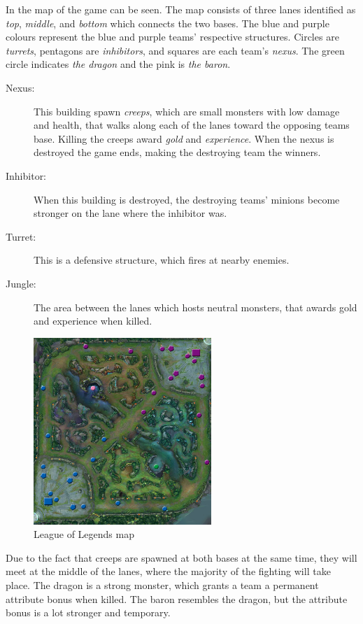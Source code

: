 In  the map of the game can be seen. The map consists of three lanes identified as \emph{top}, \emph{middle}, and \emph{bottom} which connects the two bases. The blue and purple colours represent the blue and purple teams' respective structures. Circles are \emph{turrets}, pentagons are \emph{inhibitors}, and squares are each team's \emph{nexus}. The green circle indicates \emph{the dragon} and the pink is \emph{the baron}.

\begin{description}
\item[Nexus:] This building spawn \emph{creeps}, which are small monsters with low damage and health, that walks along each of the lanes toward the opposing teams base. Killing the creeps award \emph{gold} and \emph{experience}. When the nexus is destroyed the game ends, making the destroying team the winners.
\item[Inhibitor:] When this building is destroyed, the destroying teams' minions become stronger on the lane where the inhibitor was.
\item[Turret:] This is a defensive structure, which fires at nearby enemies.
\item[Jungle:] The area between the lanes which hosts neutral monsters, that awards gold and experience when killed.
\end{description}

\begin{figure}[!htb]
  \centering
    \includegraphics[width=0.6\textwidth]{img/lolmap.jpg}
  \caption{League of Legends map~\cite{lolmap}}\label{fig:lolmap}
\end{figure}

Due to the fact that creeps are spawned at both bases at the same time, they will meet at the middle of the lanes, where the majority of the fighting will take place. The dragon is a strong monster, which grants a team a permanent attribute bonus when killed. The baron resembles the dragon, but the attribute bonus is a lot stronger and temporary.

